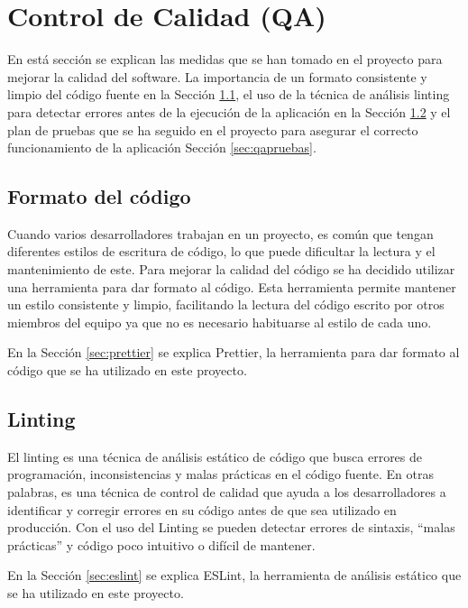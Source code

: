 \section{Control de Calidad (QA)}\label{sec:qa}
En está sección se explican las medidas que se han tomado en el proyecto para mejorar la calidad del software. La importancia de un formato consistente y limpio del código fuente en la Sección \ref{sec:qaformato}, el uso de la técnica de análisis linting para detectar errores antes de la ejecución de la aplicación en la Sección \ref{sec:qalinting} y el plan de pruebas que se ha seguido en el proyecto para asegurar el correcto funcionamiento de la aplicación Sección \ref{sec:qapruebas}.

\subsection{Formato del código}\label{sec:qaformato}
Cuando varios desarrolladores trabajan en un proyecto, es común que tengan diferentes estilos de escritura de código, lo que puede dificultar la lectura y el mantenimiento de este. Para mejorar la calidad del código se ha decidido utilizar una herramienta para dar formato al código. Esta herramienta permite mantener un estilo consistente y limpio, facilitando la lectura del código escrito por otros miembros del equipo ya que no es necesario habituarse al estilo de cada uno.

En la Sección \ref{sec:prettier} se explica Prettier, la herramienta para dar formato al código que se ha utilizado en este proyecto.

\subsection{Linting}\label{sec:qalinting}
El linting es una técnica de análisis estático de código que busca errores de programación, inconsistencias y malas prácticas en el código fuente. En otras palabras, es una técnica de control de calidad que ayuda a los desarrolladores a identificar y corregir errores en su código antes de que sea utilizado en producción. Con el uso del Linting se pueden detectar errores de sintaxis, ``malas prácticas'' y código poco intuitivo o difícil de mantener.

En la Sección \ref{sec:eslint} se explica ESLint, la herramienta de análisis estático que se ha utilizado en este proyecto.


